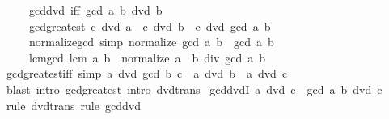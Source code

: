\begin{isabellebody}
\ \ \ \ \ gcd{\isacharunderscore}{\kern0pt}dvd{}\ {\isacharbrackleft}{\kern0pt}iff{\isacharbrackright}{\kern0pt}{\isacharcolon}{\kern0pt}\ {\isachardoublequoteopen}gcd\ a\ b\ dvd\ b{\isachardoublequoteclose}\isanewline
\ \ \ \ \ gcd{\isacharunderscore}{\kern0pt}greatest{\isacharcolon}{\kern0pt}\ {\isachardoublequoteopen}c\ dvd\ a\ {\isasymLongrightarrow}\ c\ dvd\ b\ {\isasymLongrightarrow}\ c\ dvd\ gcd\ a\ b{\isachardoublequoteclose}\isanewline
\ \ \ \ \ normalize{\isacharunderscore}{\kern0pt}gcd\ {\isacharbrackleft}{\kern0pt}simp{\isacharbrackright}{\kern0pt}{\isacharcolon}{\kern0pt}\ {\isachardoublequoteopen}normalize\ {\isacharparenleft}{\kern0pt}gcd\ a\ b{\isacharparenright}{\kern0pt}\ {\isacharequal}{\kern0pt}\ gcd\ a\ b{\isachardoublequoteclose}\isanewline
\ \ \ \ \ lcm{\isacharunderscore}{\kern0pt}gcd{\isacharcolon}{\kern0pt}\ {\isachardoublequoteopen}lcm\ a\ b\ {\isacharequal}{\kern0pt}\ normalize\ {\isacharparenleft}{\kern0pt}a\ {\isacharasterisk}{\kern0pt}\ b\ div\ gcd\ a\ b{\isacharparenright}{\kern0pt}{\isachardoublequoteclose}\isanewline
{}\isanewline
\isanewline
{}\isamarkupfalse%
\ gcd{\isacharunderscore}{\kern0pt}greatest{\isacharunderscore}{\kern0pt}iff\ {\isacharbrackleft}{\kern0pt}simp{\isacharbrackright}{\kern0pt}{\isacharcolon}{\kern0pt}\ {\isachardoublequoteopen}a\ dvd\ gcd\ b\ c\ {\isasymlongleftrightarrow}\ a\ dvd\ b\ {\isasymand}\ a\ dvd\ c{\isachardoublequoteclose}\isanewline
%
\isadelimproof
\ \ %
\endisadelimproof
%
\isatagproof
{}\isamarkupfalse%
\ {\isacharparenleft}{\kern0pt}blast\ intro{\isacharbang}{\kern0pt}{\isacharcolon}{\kern0pt}\ gcd{\isacharunderscore}{\kern0pt}greatest\ intro{\isacharcolon}{\kern0pt}\ dvd{\isacharunderscore}{\kern0pt}trans{\isacharparenright}{\kern0pt}%
\endisatagproof
{\isafoldproof}%
%
\isadelimproof
\isanewline
%
\endisadelimproof
\isanewline
{}\isamarkupfalse%
\ gcd{\isacharunderscore}{\kern0pt}dvdI{}{\isacharcolon}{\kern0pt}\ {\isachardoublequoteopen}a\ dvd\ c\ {\isasymLongrightarrow}\ gcd\ a\ b\ dvd\ c{\isachardoublequoteclose}\isanewline
%
\isadelimproof
\ \ %
\endisadelimproof
%
\isatagproof
{}\isamarkupfalse%
\ {\isacharparenleft}{\kern0pt}rule\ dvd{\isacharunderscore}{\kern0pt}trans{\isacharparenright}{\kern0pt}\ {\isacharparenleft}{\kern0pt}rule\ gcd{\isacharunderscore}{\kern0pt}dvd{}{\isacharparenright}{\kern0pt}%
\endisatagproof
{\isafoldproof}%
%
\isadelimproof
\isanewline
%
\endisadelimproof
\isanewline
{}\isamarkupfalse%

\end{isabellebody}
